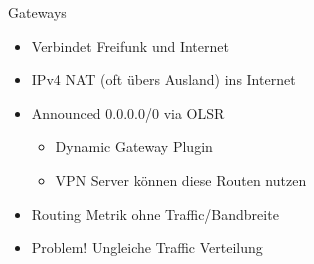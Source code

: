 \begin{frame}{Gateways}
    \begin{itemize}
        \item Verbindet Freifunk und Internet
        \item IPv4 NAT (oft übers Ausland) ins Internet
        \item Announced 0.0.0.0/0 via OLSR
        \begin{itemize}
            \item Dynamic Gateway Plugin
            \item VPN Server können diese Routen nutzen
        \end{itemize}
        \item Routing Metrik ohne Traffic/Bandbreite
        \item<2> {\color{red}Problem!} Ungleiche Traffic Verteilung
    \end{itemize}
\end{frame}
